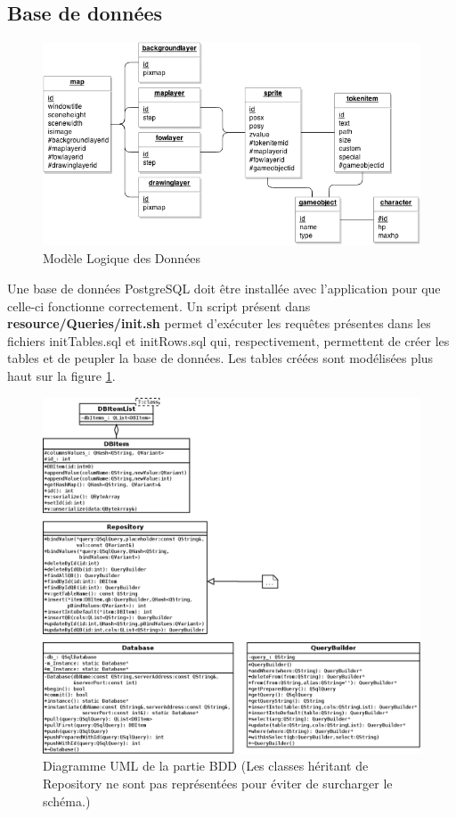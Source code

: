 \subsection {Base de données}

\begin{figure}[h!]
    \centering
    \includegraphics[width=\textwidth]{img/bdd_MLD.png}
    \caption{Modèle Logique des Données}
    \label{fig:bddmld}
\end{figure}

Une base de données PostgreSQL doit être installée avec l'application pour que celle-ci fonctionne correctement. Un script présent dans \textbf{resource/Queries/init.sh} permet d'exécuter les requêtes présentes dans les fichiers initTables.sql et initRows.sql qui, respectivement, permettent de créer les tables et de peupler la base de données. Les tables créées sont modélisées plus haut sur la figure \ref{fig:bddmld}.\\

\begin{figure}[h!]
    \centering
    \includegraphics[width=\textwidth]{img/bdd_uml.png}
    \caption{Diagramme UML de la partie BDD (Les classes héritant de Repository ne sont pas représentées pour éviter de surcharger le schéma.)}
    \label{fig:bdduml}
\end{figure}

